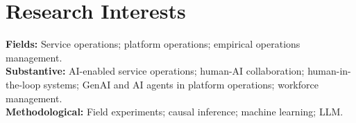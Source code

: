 \section*{Research Interests}

\textbf{Fields:} Service operations; platform operations; empirical operations management.\\
\textbf{Substantive:} AI-enabled service operations; human-AI collaboration; human-in-the-loop systems; GenAI and AI agents in platform operations; workforce management.\\
\textbf{Methodological:} Field experiments; causal inference; machine learning; LLM.

